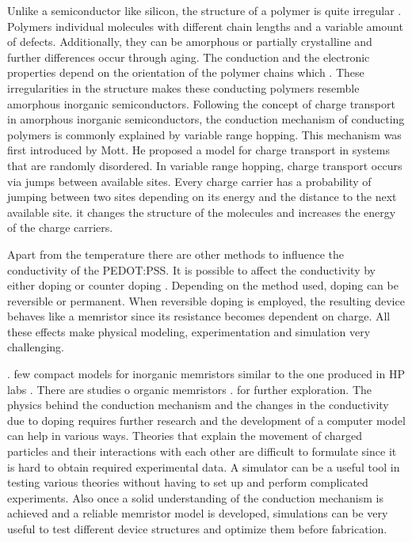 \begin{doublespace}
Unlike a semiconductor like silicon, the structure of a polymer is quite irregular \cite{PedotBook}. Polymers  individual molecules with different chain lengths and a variable amount of defects. Additionally, they can be amorphous or partially crystalline and further differences occur through aging. The conduction and the electronic properties depend on the orientation of the polymer chains which . These irregularities in the structure makes these conducting polymers resemble amorphous inorganic semiconductors. Following the concept of charge transport in amorphous inorganic semiconductors, the conduction mechanism of conducting polymers is commonly explained by variable range hopping. This mechanism was first introduced by Mott\cite{Mott}. He proposed a model for charge transport in systems that are randomly disordered. In variable range hopping, charge transport occurs via jumps between available sites. Every charge carrier has a probability of jumping between two sites depending on its energy and the distance to the next available site.  it changes the structure of the molecules and increases the energy of the charge carriers.

Apart from the temperature there are other methods to influence the conductivity of the PEDOT:PSS. It is possible to affect the conductivity by either doping or counter doping \cite{PedotDope}. Depending on the method used, doping can be reversible or permanent. When reversible doping is employed, the resulting device behaves like a memristor since its resistance becomes dependent on charge. All these effects make physical modeling, experimentation and simulation very challenging. 

.  few compact models for inorganic memristors similar to the one produced in HP labs  \cite{ChuaSim}\cite{MemCircuitSim}\cite{MemTiO2}. There are  studies o organic memristors \cite{OrganicMemSim}\cite{OrganicMem}.   for further exploration. The physics behind the conduction mechanism and the changes in the conductivity due to doping requires further research and the development of a computer model can help in various ways. Theories that explain the movement of charged particles and their interactions with each other are difficult to formulate since it is hard to obtain required experimental data. A simulator can be a useful tool in testing various theories without having to set up and perform complicated experiments. Also once a solid understanding of the conduction mechanism is achieved and a reliable memristor model is developed, simulations can be very useful to test different device structures and optimize them before fabrication. 


 \end{doublespace}